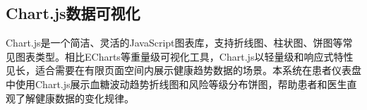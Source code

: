 \subsection{Chart.js数据可视化}

Chart.js是一个简洁、灵活的JavaScript图表库，支持折线图、柱状图、饼图等常见图表类型\todocite{}。相比ECharts等重量级可视化工具，Chart.js以轻量级和响应式特性见长，适合需要在有限页面空间内展示健康趋势数据的场景。本系统在患者仪表盘中使用Chart.js展示血糖波动趋势折线图和风险等级分布饼图，帮助患者和医生直观了解健康数据的变化规律。
